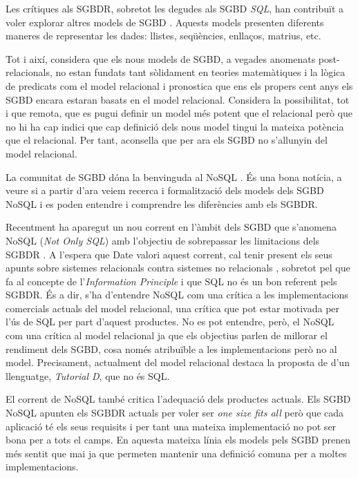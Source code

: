Les crítiques als SGBDR, sobretot les degudes als SGBD
\emph{SQL}, han contribuït a voler explorar altres models de
SGBD \parencite{stonebraker09}. Aquests models presenten diferents
maneres de representar les dades: llistes, seqüències, enllaços,
matrius, etc.

Tot i així, \textcite[cap.~21--25]{date06} considera que els nous
models de SGBD, a vegades anomenats post-relacionals, no estan fundats
tant sòlidament en teories matemàtiques i la lògica de predicats com
el model relacional i pronostica que ens els propers cent anys els
SGBD encara estaran basats en el model
relacional. %
Considera la possibilitat, tot i que remota, que es pugui definir un
model més potent que el relacional però que no hi ha cap indici que
cap definició dels nous model tingui la mateixa potència que el
relacional. Per tant, aconsella que per ara els SGBD no s'allunyin del
model relacional. %



\todo{} La comunitat de SGBD dóna la benvinguda al NoSQL
\cite{atzeni13:relational_model_dead}. És una bona notícia, a veure si
a partir d'ara veiem recerca i formalització dels models dels SGBD
NoSQL i es poden entendre i comprendre les diferències amb els SGBDR.


Recentment ha aparegut un nou corrent en l'àmbit dels SGBD que
s'anomena NoSQL (\emph{Not Only SQL}) amb l'objectiu de sobrepassar
les limitacions dels SGBDR \parencite{edlich:nosql,stonebraker10}.  A
l'espera que Date valori aquest corrent, cal tenir present els seus
apunts sobre sistemes relacionals contra sistemes no
relacionals \parencite[part 7]{date06}, sobretot pel que fa al
concepte de l'\emph{Information Principle} i que SQL no és un bon
referent pels SGBDR. És a dir, s'ha d'entendre NoSQL com una crítica a
les implementacions comercials actuals del model relacional, una
crítica que pot estar motivada per l'ús de SQL per part d'aquest
productes.  No es pot entendre, però, el NoSQL com una crítica al
model relacional ja que els objectius parlen de millorar el rendiment
dels SGBD, cosa només atribuïble a les implementacions però no al
model. Precisament, actualment del model relacional destaca la
proposta de \citeauthor{date:tutoriald} d'un llenguatge,
\emph{Tutorial D}, que no és SQL.


El corrent de NoSQL també critica l'adequació dels productes actuals.
Els SGBD NoSQL apunten els SGBDR actuals per voler ser \emph{one size
  fits all} \parencite{stonebraker07,stonebraker09} però que cada
aplicació té els seus requisits i per tant una mateixa implementació
no pot ser bona per a tots el camps.  En aquesta mateixa línia els
models pels SGBD prenen més sentit que mai ja que permeten mantenir
una definició comuna per a moltes implementacions.


